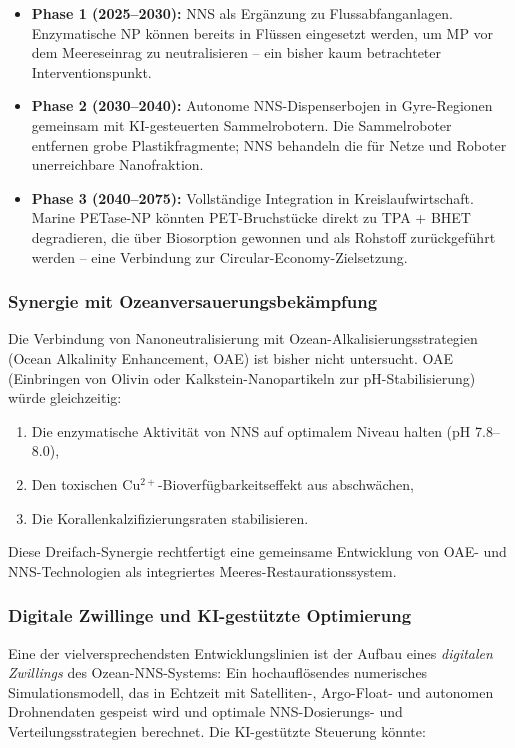 ﻿\documentclass[12pt,a4paper]{article}
\theoremstyle{definition}
\theoremstyle{remark}
\begin{document}
\begin{itemize}
  \item \textbf{Phase 1 (2025--2030):} NNS als Ergänzung zu Flussabfanganlagen.
        Enzymatische NP können bereits in Flüssen eingesetzt werden, um
        MP vor dem Meereseinrag zu neutralisieren -- ein bisher kaum
        betrachteter Interventionspunkt.
  \item \textbf{Phase 2 (2030--2040):} Autonome NNS-Dispenserbojen in Gyre-Regionen
        gemeinsam mit KI-gesteuerten Sammelrobotern. Die Sammelroboter
        entfernen grobe Plastikfragmente; NNS behandeln die für Netze und
        Roboter unerreichbare Nanofraktion.
  \item \textbf{Phase 3 (2040--2075):} Vollständige Integration in Kreislaufwirtschaft.
        Marine PETase-NP könnten PET-Bruchstücke direkt zu
        TPA + BHET degradieren, die über Biosorption gewonnen und
        als Rohstoff zurückgeführt werden -- eine Verbindung zur
        Circular-Economy-Zielsetzung.
\end{itemize}

\subsubsection{Synergie mit Ozeanversauerungsbekämpfung}

Die Verbindung von Nanoneutralisierung mit Ozean-Alkalisierungsstrategien
(Ocean Alkalinity Enhancement, OAE) ist bisher nicht untersucht. OAE
(Einbringen von Olivin oder Kalkstein-Nanopartikeln zur pH-Stabilisierung)
würde gleichzeitig:
\begin{enumerate}
  \item Die enzymatische Aktivität von NNS auf optimalem Niveau halten (pH 7.8--8.0),
  \item Den toxischen Cu$^{2+}$-Bioverfügbarkeitseffekt aus \cite{ocnscnce_epp2026}
        abschwächen,
  \item Die Korallenkalzifizierungsraten stabilisieren.
\end{enumerate}

Diese Dreifach-Synergie rechtfertigt eine gemeinsame Entwicklung von
OAE- und NNS-Technologien als integriertes Meeres-Restaurationssystem.

\subsubsection{Digitale Zwillinge und KI-gestützte Optimierung}

Eine der vielversprechendsten Entwicklungslinien ist der Aufbau eines
\emph{digitalen Zwillings} des Ozean-NNS-Systems: Ein hochauflösendes
numerisches Simulationsmodell, das in Echtzeit mit Satelliten-,
Argo-Float- und autonomen Drohnendaten gespeist wird und optimale
NNS-Dosierungs- und Verteilungsstrategien berechnet. Die KI-gestützte
Steuerung könnte:
\end{document}
